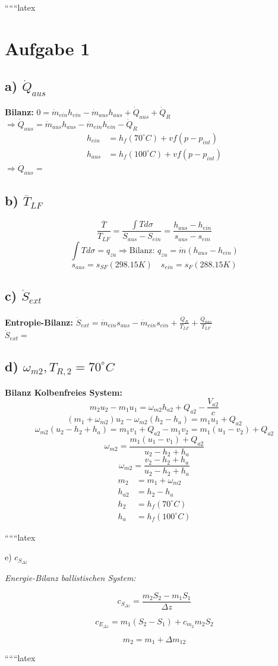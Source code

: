 
``````latex


\section*{Aufgabe 1}

\subsection*{a) $\dot{Q}_{aus}$}
\textbf{Bilanz:} $0 = \dot{m}_{ein} h_{ein} - \dot{m}_{aus} h_{aus} + \dot{Q}_{aus} + \dot{Q}_R$ \\
$\Rightarrow \dot{Q}_{aus} = \dot{m}_{aus} h_{aus} - \dot{m}_{ein} h_{ein} - \dot{Q}_R$ \\
\[
\begin{aligned}
    h_{ein} &= h_f (70^\circ C) + v f \left( p - p_{int} \right) \\
    h_{aus} &= h_f (100^\circ C) + v f \left( p - p_{int} \right)
\end{aligned}
\]
$\Rightarrow \dot{Q}_{aus} =$

\subsection*{b) $\overline{T}_{LF}$}
\[
\frac{\overline{T}}{T_{LF}} = \frac{\int T d\sigma}{S_{aus} - S_{ein}} = \frac{h_{aus} - h_{ein}}{s_{aus} - s_{ein}}
\]
\[
\int T d\sigma = q_{zu} \Rightarrow \text{Bilanz: } q_{zu} = \dot{m} (h_{aus} - h_{ein})
\]
\[
s_{aus} = s_{SF} (298.15 K) \quad s_{ein} = s_{F} (288.15 K)
\]

\subsection*{c) $\dot{S}_{ext}$}
\textbf{Entropie-Bilanz:} $\dot{S}_{ext} = \dot{m}_{ein} s_{aus} - \dot{m}_{ein} s_{ein} + \frac{\dot{Q}_R}{T_{LF}} + \frac{\dot{Q}_{aus}}{T_{LF}}$ \\
$\dot{S}_{ext} =$

\subsection*{d) $\omega_{m2}, T_{R,2} = 70^\circ C$}
\textbf{Bilanz Kolbenfreies System:}
\[
m_2 u_2 - m_1 u_1 = \omega_{m2} h_{a2} + Q_{a2} - \frac{V_{a2}}{c}
\]
\[
(m_1 + \omega_{m2}) u_2 - \omega_{m2} (h_2 - h_a) = m_1 u_1 + Q_{a2}
\]
\[
\omega_{m2} (u_2 - h_2 + h_a) = m_1 v_1 + Q_{a2} - m_1 v_2 = m_1 (u_1 - v_2) + Q_{a2}
\]
\[
\omega_{m2} = \frac{m_1 (u_1 - v_1) + Q_{a2}}{u_2 - h_2 + h_a}
\]
\[
\omega_{m2} = \frac{v_2 - h_2 + h_a}{u_2 - h_2 + h_a}
\]
\[
\begin{aligned}
    m_2 &= m_1 + \omega_{m2} \\
    h_{a2} &= h_2 - h_a \\
    h_2 &= h_f (70^\circ C) \\
    h_a &= h_f (100^\circ C)
\end{aligned}
\]

``````latex


e) \(c_{S_{\Delta z}}\)

\textit{Energie-Bilanz ballistischen System:}

\[
c_{S_{\Delta z}} = \frac{m_2 S_2 - m_1 S_1}{\Delta z}
\]

\[
c_{E_{\Delta z}} = m_1 (S_2 - S_1) + c_{m_2} m_2 S_2
\]

\[
m_2 = m_1 + \Delta m_{12}
\]

``````latex


